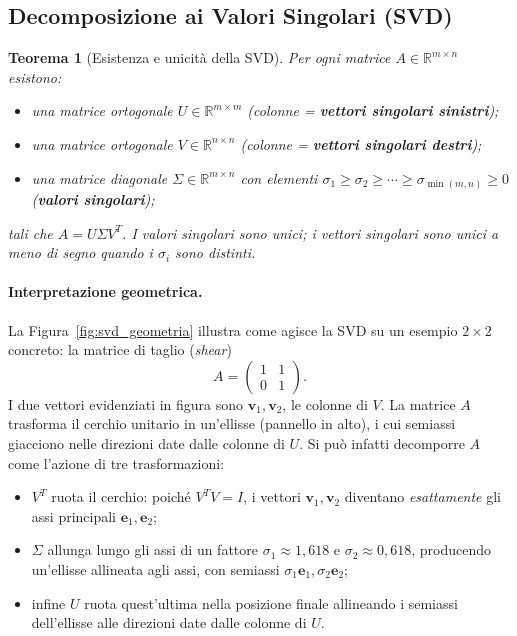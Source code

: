 \documentclass[11pt,a4paper]{article}
\theoremstyle{plain}
\newtheorem{teorema}{Teorema}[section]
\theoremstyle{definition}
\theoremstyle{remark}
\begin{document}
\medskip

\subsection{Decomposizione ai Valori Singolari (SVD)}

\begin{teorema}[Esistenza e unicità della SVD]
\label{thm:svd}
Per ogni matrice $A \in \mathbb{R}^{m \times n}$ esistono:
\begin{itemize}
  \item una matrice ortogonale $U \in \mathbb{R}^{m \times m}$ (colonne = \textbf{vettori singolari sinistri});
  \item una matrice ortogonale $V \in \mathbb{R}^{n \times n}$ (colonne = \textbf{vettori singolari destri});
  \item una matrice diagonale $\Sigma \in \mathbb{R}^{m \times n}$ con elementi
        $\sigma_1 \geq \sigma_2 \geq \cdots \geq \sigma_{\min(m,n)} \geq 0$
        (\textbf{valori singolari});
\end{itemize}
tali che $A = U \Sigma V^T$. I valori singolari sono unici; i vettori singolari
sono unici a meno di segno quando i $\sigma_i$ sono distinti.
\end{teorema}

\paragraph{Interpretazione geometrica.}
La Figura~\ref{fig:svd_geometria} illustra come agisce la SVD su un esempio
$2\times 2$ concreto: la matrice di taglio (\emph{shear})
\begin{equation}
A = \begin{pmatrix}1&1\\0&1\end{pmatrix}.
  \label{eq:esempio_shear}
\end{equation}
I due vettori evidenziati in figura sono
$\mathbf{v}_1, \mathbf{v}_2$, le colonne di $V$. 
La matrice $A$ trasforma il cerchio unitario in
un'ellisse (pannello in alto), i cui semiassi giacciono nelle direzioni date dalle colonne di $U$.
Si può infatti decomporre $A$ come l'azione di tre trasformazioni:
\begin{itemize}
\item $V^T$ ruota il cerchio: poiché $V^TV = I$, i vettori $\mathbf{v}_1,
      \mathbf{v}_2$ diventano \emph{esattamente} gli assi principali
      $\mathbf{e}_1, \mathbf{e}_2$;
\item $\Sigma$ allunga lungo gli assi di un fattore $\sigma_1 \approx
      1{,}618$ e $\sigma_2 \approx 0{,}618$, producendo un'ellisse allineata
      agli assi, con semiassi $\sigma_1\mathbf{e}_1, \sigma_2\mathbf{e}_2$;
\item infine $U$ ruota quest'ultima nella posizione finale allineando i semiassi dell'ellisse alle direzioni date dalle colonne di $U$.
\end{itemize}
\end{document}
